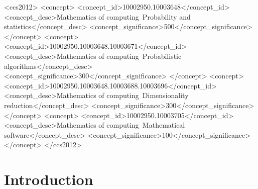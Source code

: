 \documentclass[sigconf]{acmart}  %
\begin{document}
\begin{abstract}

\end{abstract}


\begin{CCSXML}
<ccs2012>
<concept>
<concept_id>10002950.10003648</concept_id>
<concept_desc>Mathematics of computing~Probability and statistics</concept_desc>
<concept_significance>500</concept_significance>
</concept>
<concept>
<concept_id>10002950.10003648.10003671</concept_id>
<concept_desc>Mathematics of computing~Probabilistic algorithms</concept_desc>
<concept_significance>300</concept_significance>
</concept>
<concept>
<concept_id>10002950.10003648.10003688.10003696</concept_id>
<concept_desc>Mathematics of computing~Dimensionality reduction</concept_desc>
<concept_significance>300</concept_significance>
</concept>
<concept>
<concept_id>10002950.10003705</concept_id>
<concept_desc>Mathematics of computing~Mathematical software</concept_desc>
<concept_significance>100</concept_significance>
</concept>
</ccs2012>
\end{CCSXML}



\maketitle

\section{Introduction} \label{sec:intro}



\end{document}

